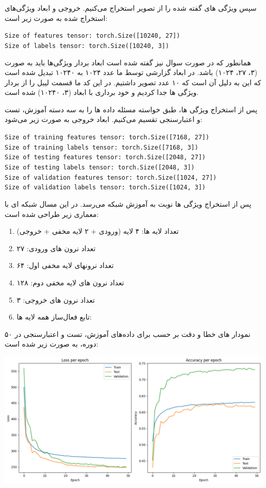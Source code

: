 \begin{qsolve}
	سپس ویژگی های گفته شده را از تصویر استخراج می‌کنیم. خروجی و ابعاد ویژگی‌های استخراج شده به صورت زیر است:
	
	\begin{latin}
		\texttt{Size of features tensor: torch.Size([10240, 27])}\\
		\texttt{Size of labels tensor: torch.Size([10240, 3])}
	\end{latin}
	همانطور که در صورت سوال نیز گفته شده است ابعاد بردار ویژگی‌ها باید به صورت (۳، ۲۷، ۱۰۲۴) باشد. در ابعاد گزارشی توسط ما عدد ۱۰۲۴ به ۱۰۲۴۰ تبدیل شده است که این به دلیل آن است که ۱۰ عدد تصویر داشتیم. در این کد ما قسمت لیبل را از بردار ویژگی ها جدا کردیم و خود برداری با ابعاد (۳، ۱۰۲۴۰) شده است.
	
	پس از استخراج ویژگی ها، طبق خواسته مسئله داده ها را به سه دسته آموزش، تست و اعتبارسنجی تقسیم می‌کنیم. ابعاد خروجی به صورت زیر می‌شود:
	
	\begin{latin}
		\texttt{Size of training features tensor: torch.Size([7168, 27])} \\
		\texttt{Size of training labels tensor: torch.Size([7168, 3])} \\
		\texttt{Size of testing features tensor: torch.Size([2048, 27])} \\
		\texttt{Size of testing labels tensor: torch.Size([2048, 3])} \\
		\texttt{Size of validation features tensor: torch.Size([1024, 27])} \\
		\texttt{Size of validation labels tensor: torch.Size([1024, 3])} \\
	\end{latin}
	
	پس از استخراج ویژگی ها نوبت به آموزش شبکه می‌رسد. در این مسال شبکه ای با معماری زیر طراحی شده است:
	
	\begin{enumerate}
		\item تعداد لایه ها: ۴ لایه (ورودی + ۲ لایه مخفی + خروجی)
		\item تعداد نرون های ورودی: ۲۷
		\item تعداد نرونهای لایه مخفی اول:‌ ۶۴
		\item تعداد نرون های لایه مخفی دوم: ۱۲۸
		\item تعداد نرون های خروجی: ۳
		\item تابع فعال‌ساز همه لایه ها: 
	\end{enumerate}
	
	نمودار های خطا و دقت بر حسب  برای داده‌های آموزش، تست و اعتبارسنجی در ۵۰ دوره، به صورت زیر شده است:
	\begin{center}
		\includegraphics*[width=0.7\linewidth]{pics/img16.png}
		\label{تصاویر با وضوح نصف}
	\end{center}
	
\end{qsolve}